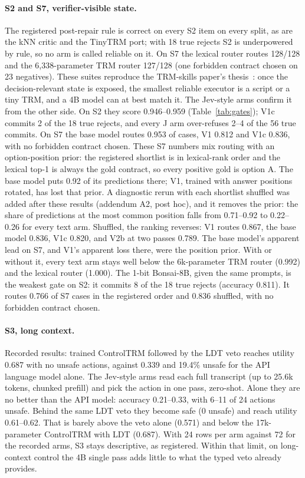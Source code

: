 \documentclass[11pt]{article}
\begin{document}
\paragraph{S2 and S7, verifier-visible state.} The registered post-repair rule is correct on every
S2 item on every split, as are the kNN critic and the TinyTRM port; with 18 true rejects S2 is
underpowered by rule, so no arm is called reliable on it. On S7 the lexical router routes 128/128 and
the 6,338-parameter TRM router 127/128 (one forbidden contract chosen on 23 negatives). These suites
reproduce the TRM-skills paper's thesis~\cite{dugan2026trmskills}: once the decision-relevant state
is exposed, the smallest reliable executor is a script or a tiny TRM, and a 4B model can at best
match it. The Jev-style arms confirm it from the other side. On S2 they score 0.946--0.959
(Table~\ref{tab:gates}); V1c commits 2 of the 18 true rejects, and every J arm over-refuses 2--4
of the 56 true commits. On S7 the base model routes 0.953 of cases, V1 0.812 and V1c 0.836, with no
forbidden contract chosen. These S7 numbers mix routing with an option-position prior: the
registered shortlist is in lexical-rank order and the lexical top-1 is always the gold contract,
so every positive gold is option A. The base model puts 0.92 of its predictions there; V1, trained
with answer positions rotated, has lost that prior. A diagnostic rerun with each shortlist
shuffled was added after these results (addendum A2, post hoc), and it removes the prior: the
share of predictions at the most common position falls from 0.71--0.92 to 0.22--0.26 for every
text arm. Shuffled, the ranking reverses: V1 routes 0.867, the base model 0.836, V1c 0.820, and
V2b at two passes 0.789. The base model's apparent lead on S7, and V1's apparent loss there, were
the position prior. With or without it, every text arm stays well below the 6k-parameter TRM
router (0.992) and the lexical router (1.000). The 1-bit Bonsai-8B, given the same prompts, is the
weakest gate on S2: it commits 8 of the 18 true rejects (accuracy 0.811). It routes 0.766 of S7
cases in the registered order and 0.836 shuffled, with no forbidden contract chosen.

\paragraph{S3, long context.} Recorded results: trained ControlTRM followed by the LDT veto reaches
utility 0.687 with no unsafe actions, against 0.339 and 19.4\% unsafe for the API language model
alone. The Jev-style arms read each full transcript (up to 25.6k tokens, chunked prefill) and
pick the action in one pass, zero-shot. Alone they are no better than the API model:
accuracy 0.21--0.33, with 6--11 of 24 actions unsafe. Behind the same LDT veto they become safe
(0 unsafe) and reach utility 0.61--0.62. That is barely above the veto alone (0.571) and below
the 17k-parameter ControlTRM with LDT (0.687). With 24 rows per arm against 72 for the recorded
arms, S3 stays descriptive, as registered. Within that limit, on long-context control the 4B
single pass adds little to what the typed veto already provides.
\end{document}
